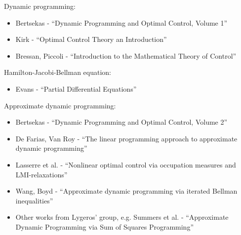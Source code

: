 \documentclass[aspectratio=169]{beamer}
\begin{document}
\begin{frame}
\footnotesize
Dynamic programming:
\begin{itemize}
\item
Bertsekas - ``Dynamic Programming and Optimal Control, Volume 1''
\item
Kirk - ``Optimal Control Theory an Introduction''
\item
Bressan, Piccoli - ``Introduction to the Mathematical Theory of Control''
\end{itemize}
Hamilton-Jacobi-Bellman equation:
\begin{itemize}
\item
Evans - ``Partial Differential Equations''
\end{itemize}
Approximate dynamic programming:
\begin{itemize}
\item
Bertsekas - ``Dynamic Programming and Optimal Control, Volume 2''
\item
De Farias, Van Roy - ``The linear programming approach to approximate dynamic programming''
\item
Lasserre et al. - ``Nonlinear optimal control via occupation measures and LMI-relaxations''
\item
Wang, Boyd - ``Approximate dynamic programming via iterated Bellman inequalities''
\item
Other works from Lygeros' group, e.g. Summers et al. - ``Approximate Dynamic Programming via Sum of Squares Programming''
\end{itemize}
\end{frame}
\end{document}
